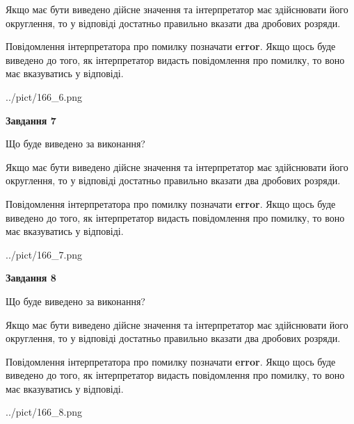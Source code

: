 \documentclass[12pt, ukrainian]{article}
\begin{document}
{\begin {Large}
Якщо має бути виведено дійсне значення та інтерпретатор має здійснювати його округлення, 
то у відповіді достатньо правильно вказати два дробових розряди.

Повідомлення інтерпретатора про помилку позначати \textbf{error}.
Якщо щось буде виведено до того, як інтерпретатор видасть повідомлення про помилку, 
то воно має вказуватись у відповіді. \par

\begin{center}
	{../pict/166_6.png}
\end{center}
\newpage

{\begin {center}\textbf{Завдання 7}\end {center}}\par
Що буде виведено за виконання? \par

Якщо має бути виведено дійсне значення та інтерпретатор має здійснювати його округлення, 
то у відповіді достатньо правильно вказати два дробових розряди.

Повідомлення інтерпретатора про помилку позначати \textbf{error}.
Якщо щось буде виведено до того, як інтерпретатор видасть повідомлення про помилку, 
то воно має вказуватись у відповіді. \par

\begin{center}
	{../pict/166_7.png}
\end{center}
\newpage

{\begin {center}\textbf{Завдання 8}\end {center}}\par
Що буде виведено за виконання? \par

Якщо має бути виведено дійсне значення та інтерпретатор має здійснювати його округлення, 
то у відповіді достатньо правильно вказати два дробових розряди.

Повідомлення інтерпретатора про помилку позначати \textbf{error}.
Якщо щось буде виведено до того, як інтерпретатор видасть повідомлення про помилку, 
то воно має вказуватись у відповіді. \par

\begin{center}
	{../pict/166_8.png}
\end{center}
\newpage


\end{Large}}
\end{document}
